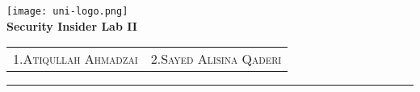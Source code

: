 \begin{titlepage}
    \centering
    \begin{onehalfspace}
    	\begin{german}
        	\texttt{[image: uni-logo.png]}\\
        	\vspace{1.0cm}
        	\large {\bfseries Security Insider Lab II}\\ 

        	\vspace{2.5cm}

            \begin{doublespace}
            	\textenglish{\textsf{\Huge{\thetitle}}}
            \end{doublespace}

        	\vspace{2cm}

         

        	\vspace{1cm}

        	{\bfseries \large{\theauthor}}

        	\vfill

        	{\large
        		\begin{tabular}[l]{cc}
        			\textsc{1.Atiqullah Ahmadzai} & \textsc{2.Sayed Alisina Qaderi} \\
        			
        		\end{tabular}
        	}

        	\vspace{1.5cm}

        	\parbox{\linewidth}{\hrule\strut}

            \vfill

	    \textgerman{\thedate}
    	\end{german}
    \end{onehalfspace}
\end{titlepage}
